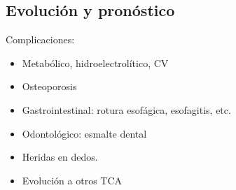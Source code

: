 \subsection*{Evolución y pronóstico}
Complicaciones:
\begin{itemize}
	\item Metabólico, hidroelectrolítico, CV
	\item Osteoporosis
	\item Gastrointestinal: rotura esofágica, esofagitis, etc.
	\item Odontológico: esmalte dental
	\item Heridas en dedos.
	\item Evolución a otros TCA
\end{itemize}
\printbibliography
